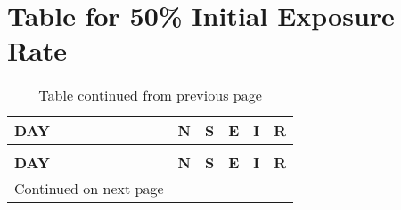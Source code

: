 \chapter{Table for 50\% Initial Exposure Rate}


\begin{longtable}{|l|l|l|l|l|l|}
	\caption{50\% Initial Exposure Rate} \\
	
	\toprule
	\textbf{DAY} & \textbf{N} & \textbf{S} & \textbf{E }& \textbf{I} &\textbf{ R} \\
	\midrule
	\endfirsthead
	\caption*{Table continued from previous page} \\
	\toprule
	\textbf{DAY} & \textbf{N} & \textbf{S} & \textbf{E }& \textbf{I} &\textbf{ R} \\
	\midrule
	\endhead
	\midrule
	\multicolumn{1}{r}{\footnotesize Continued on next page}
	\endfoot
	\bottomrule
	\endlastfoot
	

\end{longtable}
